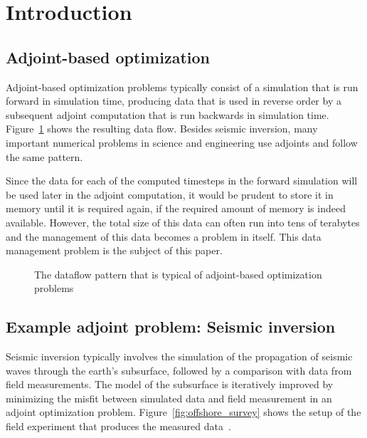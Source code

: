\section{Introduction}

\subsection{Adjoint-based optimization}
Adjoint-based optimization problems typically consist of a simulation
that is run forward in simulation time, producing data that is used in
reverse order by a subsequent adjoint computation that is run
backwards in simulation time.  Figure~\ref{fig:dataflow} shows the
resulting data flow. Besides seismic inversion, many important
numerical problems in science and engineering use adjoints and follow
the same pattern. 

Since the data for each of the computed timesteps in the forward
simulation will be used later in the adjoint computation, it would be
prudent to store it in memory until it is required again, if the required amount
of memory is indeed available. However, the total size of this data
can often run into tens of terabytes and the management of this data
becomes a problem in itself. This data management problem is the
subject of this paper. 

\begin{figure}
\begin{center}

\end{center}
\caption{The dataflow pattern that is typical of adjoint-based optimization problems}
\label{fig:dataflow}
\end{figure}

\subsection{Example adjoint problem: Seismic inversion}
Seismic inversion typically involves the simulation of the propagation
of seismic waves through the earth's subsurface, followed by a
comparison with data from field measurements. The model of the
subsurface is iteratively improved by minimizing the misfit between
simulated data and field measurement in an adjoint optimization
problem.  Figure~\ref{fig:offshore_survey} shows the setup of the
field experiment that produces the measured
data~\cite{plessix2006review}. 


